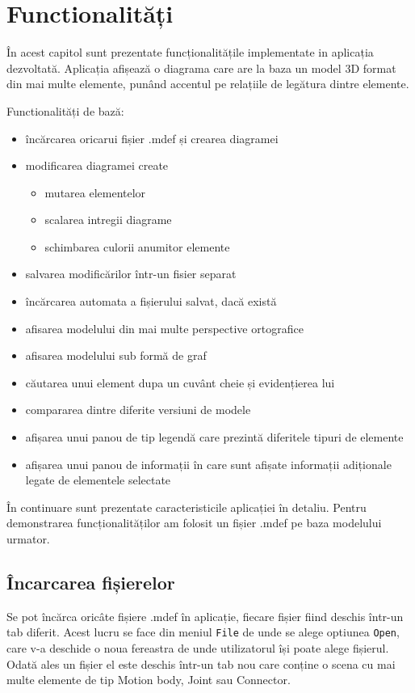 \newpage
\section{Functionalități}

În acest capitol sunt prezentate funcționalitățile implementate in aplicația dezvoltată. Aplicația afișează o diagrama 
care are la baza un model 3D format din mai multe elemente, punând accentul pe relațiile de legătura dintre elemente.\newline

Functionalități de bază:
\begin{itemize}
    \item încărcarea oricarui fișier .mdef și crearea diagramei
    \item modificarea diagramei create
    \begin{itemize}
        \item mutarea elementelor
        \item scalarea intregii diagrame
        \item schimbarea culorii anumitor elemente
    \end{itemize} 
    \item salvarea modificărilor într-un fisier separat
    \item încărcarea automata a fișierului salvat, dacă există
    \item afisarea modelului din mai multe perspective ortografice
    \item afisarea modelului sub formă de graf
    \item căutarea unui element dupa un cuvânt cheie și evidențierea lui
    \item compararea dintre diferite versiuni de modele
    \item afișarea unui panou de tip legendă care prezintă diferitele tipuri de elemente
    \item afișarea unui panou de informații în care sunt afișate informații adiționale legate de elementele selectate
\end{itemize}

În continuare sunt prezentate caracteristicile aplicației în detaliu. Pentru demonstrarea funcționalităților am folosit un fișier .mdef
pe baza modelului urmator.

\subsection{Încarcarea fișierelor}
Se pot încărca oricâte fișiere .mdef în aplicație, fiecare fișier fiind deschis într-un tab diferit. 
Acest lucru se face din meniul \verb|File| de unde se alege optiunea \verb|Open|, care v-a deschide o noua fereastra de 
unde utilizatorul își poate alege fișierul. 
Odată ales un fișier el este deschis într-un tab nou care conține o scena cu mai multe elemente de tip Motion body, 
Joint sau Connector.\newline

